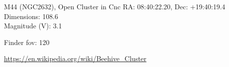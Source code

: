 \begin{block}{M44 (NGC2632), Open Cluster in Cnc}
    RA: 08:40:22.20, Dec: +19:40:19.4 \\ 
    Dimensions: 108.6 \\ 
    Magnitude (V): 3.1



    Finder fov: 120 

    \url{https://en.wikipedia.org/wiki/Beehive_Cluster} 
\end{block}